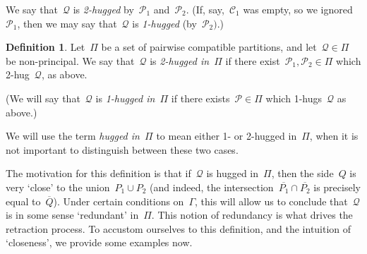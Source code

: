 \documentclass[11pt]{amsart}
\theoremstyle{definition}
\theoremstyle{definition}
\theoremstyle{definition}
\theoremstyle{definition}
\newtheorem{definition}[theorem]{Definition}
\newcommand{\calC}{\mathcal{C}}
\newcommand{\calQ}{\mathcal{Q}}
\newcommand{\calP}{\mathcal{P}} %
\begin{document}
We say that~$\calQ$ is \emph{2-hugged} by~$\calP_1$ and~$\calP_2$. (If, say,~$\calC_1$ was empty, so we ignored~$\calP_1$, then we may say that~$\calQ$ is \emph{1-hugged} (by~$\calP_2)$.)

\begin{definition}\label{def:2-hugged in Pi}
    Let~$\Pi$ be a set of pairwise compatible partitions, and let~$\calQ \in \Pi$ be non-principal. We say that~$\calQ$ is \emph{2-hugged in~$\Pi$} if there exist~$\calP_1, \calP_2 \in \Pi$ which 2-hug~$\calQ$, as above. 
    
    (We will say that~$\calQ$ is \emph{1-hugged in~$\Pi$} if there exists~$\calP \in \Pi$ which 1-hugs~$\calQ$ as above.)

    We will use the term \emph{hugged in~$\Pi$} to mean either 1- or 2-hugged in~$\Pi$, when it is not important to distinguish between these two cases.
\end{definition}

The motivation for this definition is that if~$\calQ$ is hugged in~$\Pi$, then the side~$Q$ is very `close' to the union~$P_1 \cup P_2$ (and indeed, the intersection~$\overline{P_1} \cap \overline{P_2}$ is precisely equal to~$\overline{Q}$). Under certain conditions on~$\Gamma$, this will allow us to conclude that~$\calQ$ is in some sense `redundant' in~$\Pi$. This notion of redundancy is what drives the retraction process. To accustom ourselves to this definition, and the intuition of `closeness', we provide some examples now.
\end{document}
